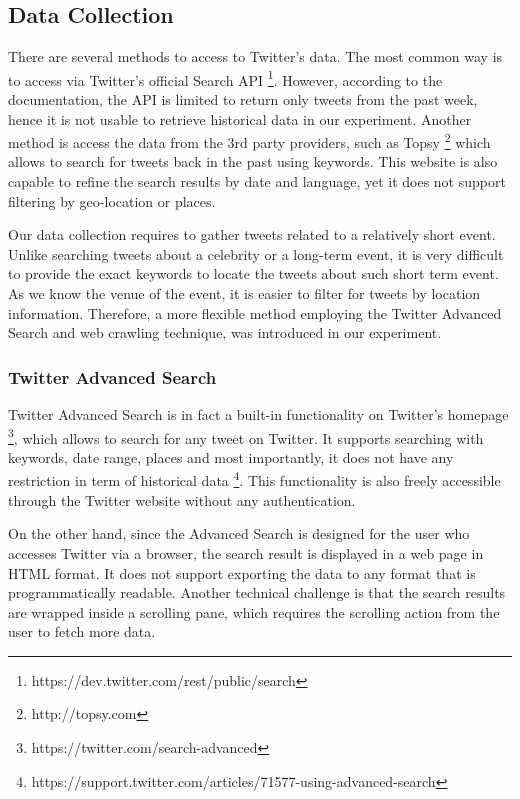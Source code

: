 \subsection{Data Collection}
There are several methods to access to Twitter's data. The most common way is to access via Twitter's official Search API \footnote{https://dev.twitter.com/rest/public/search}. However, according to the documentation, the API is limited to return only tweets from the past week, hence it is not usable to retrieve historical data in our experiment. Another method is access the data from the 3rd party providers, such as Topsy \footnote{http://topsy.com} which allows to search for tweets back in the past using keywords. This website is also capable to refine the search results by date and language, yet it does not support filtering by geo-location or places. 

Our data collection requires to gather tweets related to a relatively short event. Unlike searching tweets about a celebrity or a long-term event, it is very difficult to provide the exact keywords to locate the tweets about such short term event. As we know the venue of the event, it is easier to filter for tweets by location information. Therefore, a more flexible method employing the Twitter Advanced Search and web crawling technique, was introduced in our experiment.

\subsubsection{Twitter Advanced Search}
Twitter Advanced Search is in fact a built-in functionality on Twitter's homepage \footnote{https://twitter.com/search-advanced}, which allows to search for any tweet on Twitter. It supports searching with keywords, date range, places and most importantly, it does not have any restriction in term of historical data \footnote{https://support.twitter.com/articles/71577-using-advanced-search}. This functionality is also freely accessible through the Twitter website without any authentication.

On the other hand, since the Advanced Search is designed for the user who accesses Twitter via a browser, the search result is displayed in a web page in HTML format. It does not support exporting the data to any format that is programmatically readable. Another technical challenge is that the search results are wrapped inside a scrolling pane, which requires the scrolling action from the user to fetch more data. 

